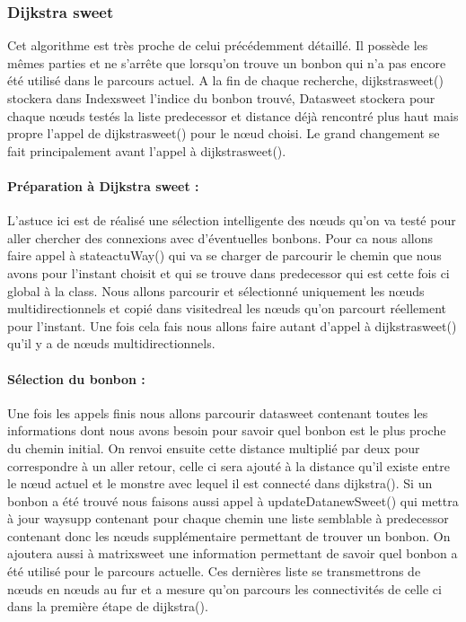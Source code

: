 \documentclass[12pt, oneside]{article}
\begin{document}
\subsubsection{Dijkstra sweet}
Cet algorithme est très proche de celui précédemment détaillé. Il possède les mêmes parties et ne s’arrête que lorsqu’on trouve un bonbon qui n’a pas encore été utilisé dans le parcours actuel. A la fin de chaque recherche, dijkstra\textunderscore sweet() stockera dans Index\textunderscore sweet l’indice du bonbon trouvé, Data\textunderscore sweet stockera pour chaque nœuds testés la liste predecessor et distance déjà rencontré plus haut mais propre l’appel de dijkstra\textunderscore sweet() pour le nœud choisi.
Le grand changement se fait principalement avant l’appel à dijkstra\textunderscore sweet().
\paragraph{Préparation à Dijkstra sweet :}
L’astuce ici est de réalisé une sélection intelligente des nœuds qu’on va testé pour aller chercher des connexions avec d’éventuelles bonbons.
Pour ca nous allons faire appel à state\textunderscore actuWay() qui va se charger de parcourir le chemin que nous avons pour l’instant choisit et qui se trouve dans predecessor qui est cette fois ci global à la class. Nous allons parcourir et sélectionné uniquement les nœuds multidirectionnels et copié dans visited\textunderscore real les nœuds qu’on parcourt réellement pour l’instant. Une fois cela fais nous allons faire autant d’appel à dijkstra\textunderscore sweet() qu’il y a de nœuds multidirectionnels.

\paragraph{Sélection du bonbon :}
Une fois les appels finis nous allons parcourir data\textunderscore sweet contenant toutes les informations dont nous avons besoin pour savoir quel bonbon est le plus proche du chemin initial. On renvoi ensuite cette distance multiplié par deux pour correspondre à un aller retour, celle ci sera ajouté à la distance qu’il existe entre le nœud actuel et le monstre avec lequel il est connecté dans dijkstra().
Si un bonbon a été trouvé nous faisons aussi appel à updateData\textunderscore newSweet() qui mettra à jour way\textunderscore supp contenant pour chaque chemin une liste semblable à predecessor contenant donc les nœuds supplémentaire permettant de trouver un bonbon. On ajoutera aussi à matrix\textunderscore sweet une information permettant de savoir quel bonbon a été utilisé pour le parcours actuelle. Ces dernières liste se transmettrons de nœuds en nœuds au fur et a mesure qu’on parcours les connectivités de celle ci dans la première étape de dijkstra().
\end{document}
